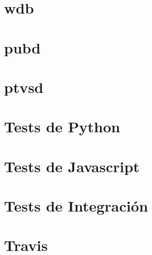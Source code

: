 \documentclass[letterpaper,10pt,spanish]{sphinxmanual}
\begin{document}
\section{wdb}
\label{\detokenize{tecnico/debug/wdb:wdb}}\label{\detokenize{tecnico/debug/wdb:id1}}\label{\detokenize{tecnico/debug/wdb::doc}}

\section{pubd}
\label{\detokenize{tecnico/debug/pudb:pubd}}\label{\detokenize{tecnico/debug/pudb:id1}}\label{\detokenize{tecnico/debug/pudb::doc}}

\section{ptvsd}
\label{\detokenize{tecnico/debug/ptvsd:ptvsd}}\label{\detokenize{tecnico/debug/ptvsd:id1}}\label{\detokenize{tecnico/debug/ptvsd::doc}}


\section{Tests de Python}
\label{\detokenize{tecnico/tests-y-ci/tests-de-python:tests-de-python}}\label{\detokenize{tecnico/tests-y-ci/tests-de-python:id1}}\label{\detokenize{tecnico/tests-y-ci/tests-de-python::doc}}

\section{Tests de Javascript}
\label{\detokenize{tecnico/tests-y-ci/tests-de-javascript:tests-de-javascript}}\label{\detokenize{tecnico/tests-y-ci/tests-de-javascript:id1}}\label{\detokenize{tecnico/tests-y-ci/tests-de-javascript::doc}}

\section{Tests de Integración}
\label{\detokenize{tecnico/tests-y-ci/tests-de-integracion:tests-de-integracion}}\label{\detokenize{tecnico/tests-y-ci/tests-de-integracion:id1}}\label{\detokenize{tecnico/tests-y-ci/tests-de-integracion::doc}}

\section{Travis}
\label{\detokenize{tecnico/tests-y-ci/travis:travis}}\label{\detokenize{tecnico/tests-y-ci/travis:id1}}\label{\detokenize{tecnico/tests-y-ci/travis::doc}}
\end{document}

